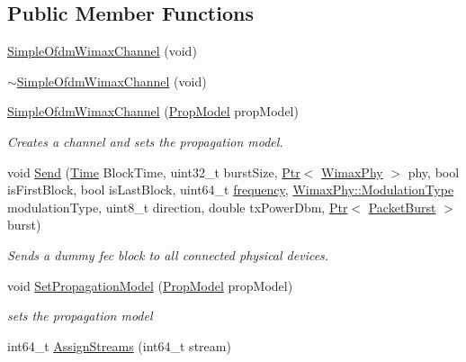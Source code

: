 \subsection*{Public Member Functions}
\begin{DoxyCompactItemize}
\item 
\hyperlink{classns3_1_1SimpleOfdmWimaxChannel_ad3c357789fdf1f48b072b4d07a83fdaf}{Simple\+Ofdm\+Wimax\+Channel} (void)
\item 
\hyperlink{classns3_1_1SimpleOfdmWimaxChannel_a02b12edf18ac409eef82c5de9a8da725}{$\sim$\+Simple\+Ofdm\+Wimax\+Channel} (void)
\item 
\hyperlink{classns3_1_1SimpleOfdmWimaxChannel_a72558177adf5f7bcebc312cf36cbd584}{Simple\+Ofdm\+Wimax\+Channel} (\hyperlink{classns3_1_1SimpleOfdmWimaxChannel_ad8299e6adf4848b1cf213df963e94842}{Prop\+Model} prop\+Model)
\begin{DoxyCompactList}\small\item\em Creates a channel and sets the propagation model. \end{DoxyCompactList}\item 
void \hyperlink{classns3_1_1SimpleOfdmWimaxChannel_ac056bb3c46b4ecc56b4fe32fefd79bc6}{Send} (\hyperlink{classns3_1_1Time}{Time} Block\+Time, uint32\+\_\+t burst\+Size, \hyperlink{classns3_1_1Ptr}{Ptr}$<$ \hyperlink{classns3_1_1WimaxPhy}{Wimax\+Phy} $>$ phy, bool is\+First\+Block, bool is\+Last\+Block, uint64\+\_\+t \hyperlink{mmwave_2model_2fading-traces_2fading__trace__generator_8m_a09045328d6d7e16aa4013f526cc6993d}{frequency}, \hyperlink{classns3_1_1WimaxPhy_a044c5d8a48ca992c39c2a946f6e755fa}{Wimax\+Phy\+::\+Modulation\+Type} modulation\+Type, uint8\+\_\+t direction, double tx\+Power\+Dbm, \hyperlink{classns3_1_1Ptr}{Ptr}$<$ \hyperlink{classns3_1_1PacketBurst}{Packet\+Burst} $>$ burst)
\begin{DoxyCompactList}\small\item\em Sends a dummy fec block to all connected physical devices. \end{DoxyCompactList}\item 
void \hyperlink{classns3_1_1SimpleOfdmWimaxChannel_a1b502ad69b48d137a2938c708341a128}{Set\+Propagation\+Model} (\hyperlink{classns3_1_1SimpleOfdmWimaxChannel_ad8299e6adf4848b1cf213df963e94842}{Prop\+Model} prop\+Model)
\begin{DoxyCompactList}\small\item\em sets the propagation model \end{DoxyCompactList}\item 
int64\+\_\+t \hyperlink{classns3_1_1SimpleOfdmWimaxChannel_a6188d13118d4d65b4b3679b8d3bc8626}{Assign\+Streams} (int64\+\_\+t stream)
\end{DoxyCompactItemize}
